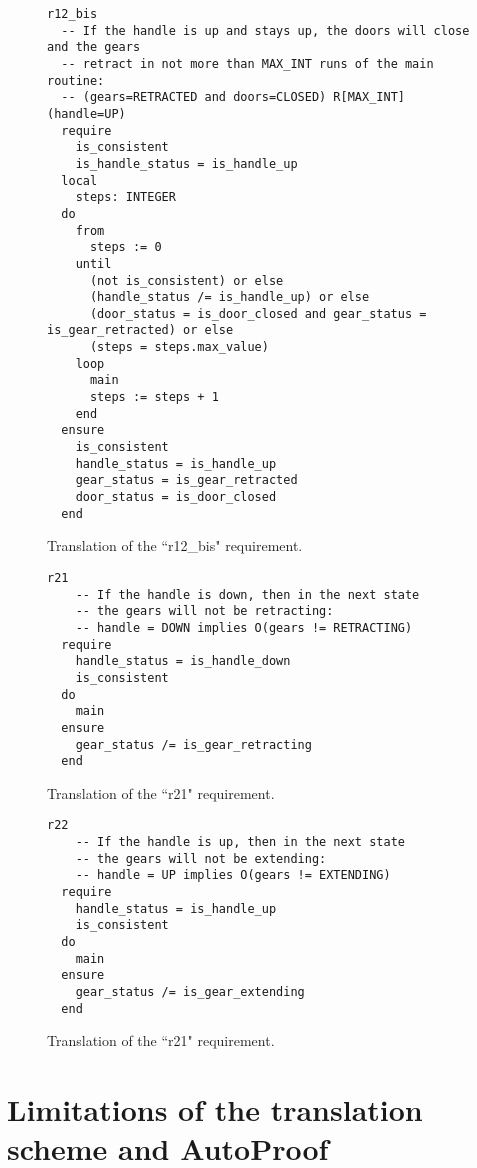 \begin{figure}
\begin{lstlisting}
r12_bis
  -- If the handle is up and stays up, the doors will close and the gears
  -- retract in not more than MAX_INT runs of the main routine:
  -- (gears=RETRACTED and doors=CLOSED) R[MAX_INT] (handle=UP)
  require
    is_consistent
  	is_handle_status = is_handle_up
  local
    steps: INTEGER
  do
    from
      steps := 0
    until
      (not is_consistent) or else
      (handle_status /= is_handle_up) or else
      (door_status = is_door_closed and gear_status = is_gear_retracted) or else
      (steps = steps.max_value)
    loop
      main
      steps := steps + 1
    end
  ensure
  	is_consistent
    handle_status = is_handle_up
    gear_status = is_gear_retracted
    door_status = is_door_closed
  end

\end{lstlisting}
\caption{Translation of the ``r12\_bis" requirement.}
\label{fig:r12_bis_translation}
\end{figure}


\begin{figure}
\begin{lstlisting}
r21
    -- If the handle is down, then in the next state
    -- the gears will not be retracting:
    -- handle = DOWN implies O(gears != RETRACTING)
  require
    handle_status = is_handle_down
    is_consistent
  do
    main
  ensure
    gear_status /= is_gear_retracting
  end
\end{lstlisting}
\caption{Translation of the ``r21" requirement.}
\label{fig:r21_translation}
\end{figure}

\begin{figure}
\begin{lstlisting}
r22
    -- If the handle is up, then in the next state
    -- the gears will not be extending:
    -- handle = UP implies O(gears != EXTENDING)
  require
    handle_status = is_handle_up
    is_consistent
  do
    main
  ensure
    gear_status /= is_gear_extending
  end
\end{lstlisting}
\caption{Translation of the ``r21" requirement.}
\label{fig:r22_translation}
\end{figure}


\section{Limitations of the translation scheme and AutoProof}
\label{sec:limitations}



